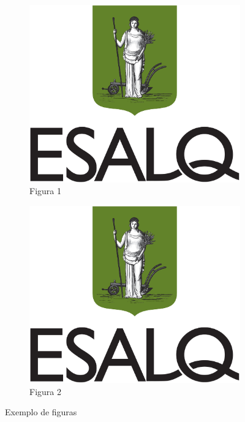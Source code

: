 \documentclass{article}
\begin{document}
	\begin{figure}[!ht]
		\begin{subfigure}{.5\textwidth}
			\centering
			\includegraphics[width=0.9\linewidth]{Figuras/brasao_esalq1.jpg}
			\caption{Figura 1}
			\label{fig:figura1subfig}
		\end{subfigure}
		\begin{subfigure}{.5\textwidth}
			\centering
			\includegraphics[width=0.9\linewidth]{Figuras/brasao_esalq1.jpg}
			\caption{Figura 2}
			\label{fig:figura2subfig}
		\end{subfigure}
		
		\caption{Exemplo de figuras}
		\label{fig:figuras}
		
	\end{figure}
	
\end{document}

